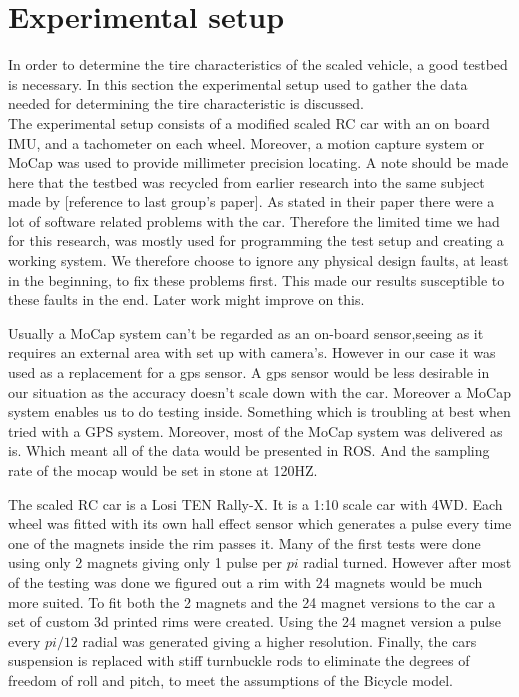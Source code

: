\section{Experimental setup}
 

In order to determine the tire characteristics of the scaled vehicle, a good testbed is necessary. In this section the experimental setup used to gather the data needed for determining the tire characteristic is discussed.\\
The experimental setup consists of a modified scaled RC car with an on board IMU, and a tachometer on each wheel. Moreover, a motion capture system or MoCap was used to provide millimeter precision locating. A note should be made here that the testbed was recycled from earlier research into the same subject made by [reference to last group's paper]. As stated in their paper there were a lot of software related problems with the car. Therefore the limited time we had for this research, was mostly used for programming the test setup and creating a working system. We therefore choose to ignore any physical design faults, at least in the beginning, to fix these problems first. This made our results susceptible to these faults in the end. Later work might improve on this. 

Usually a MoCap system can't be regarded as an \textquotesingle on-board sensor\textquotesingle ,seeing as it requires an external area with set up with camera's. However in our case it was used as a replacement for a gps sensor. A gps sensor would be less desirable in our situation as the accuracy doesn't scale down with the car. Moreover a MoCap system enables us to do testing inside. Something which is troubling at best when tried with a GPS system. Moreover, most of the MoCap system was delivered as is. Which meant all of the data would be presented in ROS. And the sampling rate of the mocap would be set in stone at 120HZ.

The scaled RC car is a Losi TEN Rally-X. It is a 1:10 scale car with 4WD.  
Each wheel was fitted with it\textquotesingle s own hall effect sensor which generates a pulse every time one of the magnets inside the rim passes it. Many of the first tests were done using only 2 magnets giving only 1 pulse per \(pi\) radial turned. However after most of the testing was done we figured out a rim with 24 magnets would be much more suited. To fit both the 2 magnets and the 24 magnet versions to the car a set of custom 3d printed rims were created. Using the 24 magnet version a pulse every \(pi/12\) radial was generated giving a higher resolution. Finally, the car\textquotesingle s suspension is replaced with stiff turnbuckle rods to eliminate the degrees of freedom of roll and pitch, to meet the assumptions of the Bicycle model.

